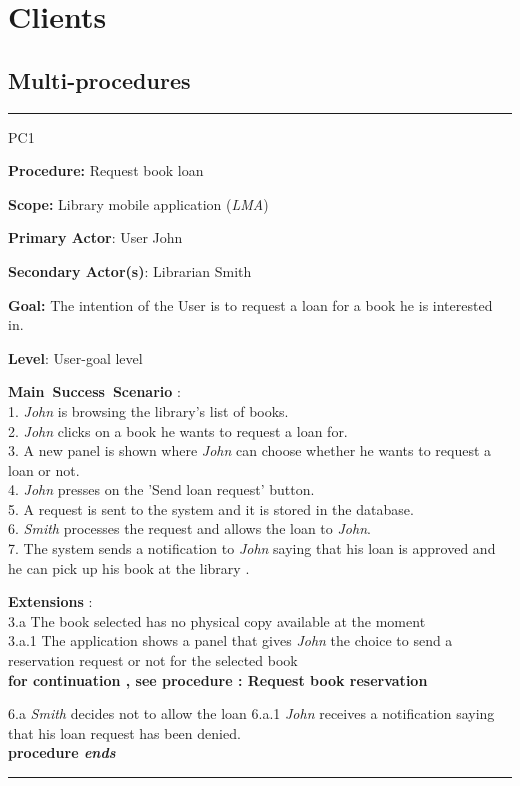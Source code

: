 \section{Clients}
\label{chap:usage_guide}

\subsection{Multi-procedures}

\vspace{0.5cm}
\hrule
\begin{lyxlist}{PC1}
\small{
\item [\textbf{Procedure:}] Request book loan
\item [\textbf{Scope:}] Library mobile application (\emph{LMA})
\item [\textbf{Primary Actor}:] User John
\item [\textbf{Secondary Actor(s)}:] Librarian Smith
\item [\textbf{Goal:}] The intention of the User is to request a loan for a book
he is interested in.
\item [\textbf{Level}:] User-goal level
\item [\textbf{Main~Success~Scenario}]:\\
1. \emph{John} is browsing the library's list of books. \\
2. \emph{John} clicks on a book he wants to request a loan for. \\
3. A new panel is shown where \emph{John} can choose whether he wants to
request a loan or not. \\
4. \emph{John} presses on the 'Send loan request' button. \\
5. A request is sent to the system and it is stored in the database. \\
6. \emph{Smith}  processes the request and allows the loan to \emph{John}.\\ 
7. The system sends a notification to \emph{John} saying that his loan is
approved and he can pick up his book at the library .\\


\item [\textbf{Extensions}]:\\
3.a The book selected has no physical copy available at the moment\\
\hspace*{0.5cm} 3.a.1 The application shows a panel that gives \emph{John} the
choice to send a reservation request or not for the selected book \\
\hspace*{0.5cm} \textbf{for continuation , see procedure : Request book
reservation}

6.a \emph{Smith} decides not to allow the loan
\hspace*{0.5cm} 6.a.1 \emph{John} receives a notification saying that his loan
request has been denied.\\
\hspace*{0.5cm} \textbf{procedure \emph{ends}}

}

\end{lyxlist}
\hrule

